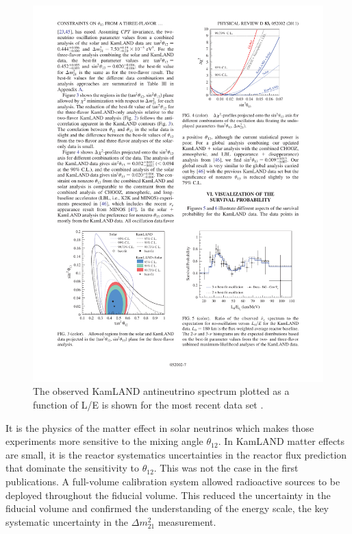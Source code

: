 \begin{figure}
\begin{center}
\includegraphics[trim=0.3cm 0.1cm 0.5cm 0.1cm, clip=true, width=0.58\columnwidth]{KamLAND_Osc_Plot.pdf} 
\caption{\label{kamPlot} The observed KamLAND antineutrino spectrum plotted as a function of L/E is shown for the most recent data set \cite{Gando:2010aa}.}
\end{center}
\end{figure}

It is the physics of the matter effect in solar neutrinos which makes those experiments more sensitive to the mixing angle $\theta_{12}$.  In KamLAND matter effects are small, it is the reactor systematics uncertainties in the reactor flux prediction that dominate the sensitivity to $\theta_{12}$. This was not the case in the first  publications\cite{Eguchi:2002dm, Araki:2004mb}.  A full-volume calibration system allowed radioactive sources to be deployed throughout the fiducial volume\cite{fourpi}. This reduced the uncertainty in the fiducial volume and confirmed the understanding of the energy scale, the key systematic uncertainty in the $\Delta m^{2}_{21}$ measurement.  

